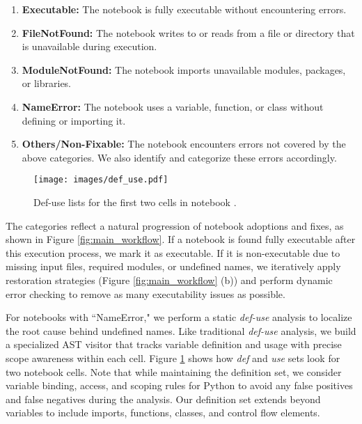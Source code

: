         \begin{enumerate}
            \item \textbf{Executable:} The notebook is fully executable without encountering errors.
            \item \textbf{FileNotFound:} The notebook writes to or reads from a file or directory that is unavailable during execution.
            \item \textbf{ModuleNotFound:} The notebook imports unavailable modules, packages, or libraries.
            \item \textbf{NameError:} The notebook uses a variable, function, or class without defining or importing it.
            \item \textbf{Others/Non-Fixable:} The notebook encounters errors not covered by the above categories. We also identify and categorize these errors accordingly.
        \end{enumerate}

        \begin{figure}[t!] %
            \texttt{[image: images/def\_use.pdf]}
            \caption{Def-use lists for the first two cells in notebook \cite{pytopia}.}
            \label{fig:def-use}
        \end{figure}

        \noindent The categories reflect a natural progression of notebook adoptions and fixes, as shown in Figure \ref{fig:main_workflow}. 
        If a notebook is found fully executable after this execution process, we mark it as executable. If it is non-executable due to missing input files, required modules, or undefined names, we iteratively apply restoration strategies (Figure \ref{fig:main_workflow} (b)) and perform dynamic error checking to remove as many executability issues as possible.

        
        For notebooks with ``NameError," we perform a static {\em def-use} analysis to localize the root cause behind undefined names. Like traditional {\em def-use} analysis, we build a specialized AST visitor that tracks variable definition and usage with precise scope awareness within each cell. Figure \ref{fig:def-use} shows how \textit{def} and \textit{use} sets look for two notebook cells. Note that while maintaining the definition set, we consider variable binding, access, and scoping rules for Python to avoid any false positives and false negatives during the analysis. Our definition set extends beyond variables to include imports, functions, classes, and control flow elements. 
        
